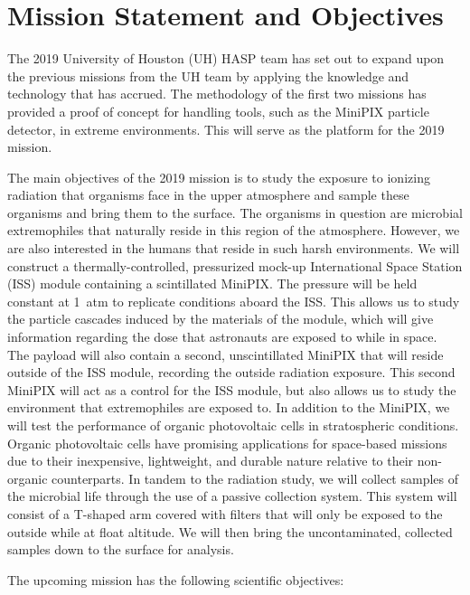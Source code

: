 \section{Mission Statement and Objectives}
\label{sec:Introduction}


The 2019 University of Houston (UH) HASP team has set out to expand upon the previous missions \cite{SORA1}\cite{SORA2} from the UH team by applying the knowledge and technology that has accrued.
The methodology of the first two missions has provided a proof of concept for handling tools, such as the MiniPIX particle detector,  in extreme environments.
This will serve as the platform for the 2019 mission.

The main objectives of the 2019 mission is to study the exposure to ionizing radiation that organisms face in the upper atmosphere and sample these organisms and bring them to the surface.
The organisms in question are microbial extremophiles that naturally reside in this region of the atmosphere. 
However, we are also interested in the humans that reside in such harsh environments.
We will construct a thermally-controlled, pressurized mock-up International Space Station (ISS) module containing a scintillated MiniPIX.
The pressure will be held constant at \SI{1}{atm} to replicate conditions aboard the ISS.
This allows us to study the particle cascades induced by the materials of the module, which will give information regarding the dose that astronauts are exposed to while in space.
The payload will also contain a second, unscintillated MiniPIX that will reside outside of the ISS module, recording the outside radiation exposure.
This second MiniPIX will act as a control for the ISS module, but also allows us to study the environment that extremophiles are exposed to.
In addition to the MiniPIX, we will test the performance of organic photovoltaic cells in stratospheric conditions.
Organic photovoltaic cells have promising applications for space-based missions due to their inexpensive, lightweight, and durable nature relative to their non-organic counterparts.
In tandem to the radiation study, we will collect samples of the microbial life through the use of a passive collection system.
This system will consist of a T-shaped arm covered with filters that will only be exposed to the outside while at float altitude.
We will then bring the uncontaminated, collected samples down to the surface for analysis.

\noindent The upcoming mission has the following scientific objectives:

